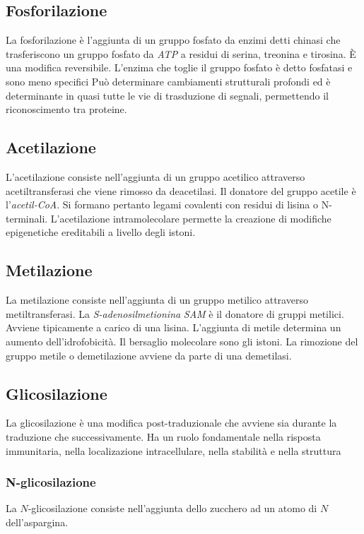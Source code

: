 	\subsection{Fosforilazione}
	La fosforilazione \`e l'aggiunta di un gruppo fosfato da enzimi detti chinasi che trasferiscono un gruppo fosfato da \emph{ATP} a residui di serina, treonina e tirosina.
	\`E una modifica reversibile. 
	L'enzima che toglie il gruppo fosfato \`e detto fosfatasi e sono meno specifici
	Pu\`o determinare cambiamenti strutturali profondi ed \`e determinante in quasi tutte le vie di trasduzione di segnali, permettendo il riconoscimento tra proteine.

	\subsection{Acetilazione}
	L'acetilazione consiste nell'aggiunta di un gruppo acetilico attraverso acetiltransferasi che viene rimosso da deacetilasi. 
	Il donatore del gruppo acetile \`e l'\emph{acetil-CoA}.
	Si formano pertanto legami covalenti con residui di lisina o N-terminali.
	L'acetilazione intramolecolare permette la creazione di modifiche epigenetiche ereditabili a livello degli istoni.


	\subsection{Metilazione}
	La metilazione consiste nell'aggiunta di un gruppo metilico attraverso metiltransferasi.
	La \emph{S-adenosilmetionina} \emph{SAM} \`e il donatore di gruppi metilici.
	Avviene tipicamente a carico di una lisina.
	L'aggiunta di metile determina un aumento dell'idrofobicit\`a.
	Il bersaglio molecolare sono gli istoni.
	La rimozione del gruppo metile o demetilazione avviene da parte di una demetilasi.

	\subsection{Glicosilazione}
	La glicosilazione \`e una modifica post-traduzionale che avviene sia durante la traduzione che successivamente.
	Ha un ruolo fondamentale nella risposta immunitaria, nella localizazione intracellulare, nella stabilit\`a e nella struttura

		\subsubsection{N-glicosilazione}
		La $N$-glicosilazione consiste nell'aggiunta dello zucchero ad un atomo di $N$ dell'aspargina.

